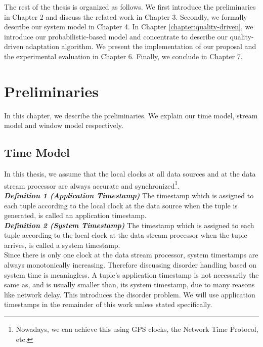 \documentclass[a4paper, 11pt, twoside]{report}
\begin{document}
The rest of the thesis is organized as follows. We first introduce the preliminaries in Chapter 2 and discuss the related work in Chapter 3. Secondly, we formally describe our system model in Chapter 4. In Chapter \ref{chapter:quality-driven}, we introduce our probabilistic-based model and concentrate to describe our quality-driven adaptation algorithm. We present the implementation of our proposal and the experimental evaluation in Chapter 6. Finally, we conclude in Chapter 7.\\

\cleardoublepage


\chapter{Preliminaries}
In this chapter, we describe the preliminaries. We explain our time model, stream model and window model respectively.\\

\section{Time Model}
In this thesis, we assume that the local clocks at all data sources and at the data stream processor are always accurate and synchronized\footnote{Nowadays, we can achieve this using GPS clocks, the Network Time Protocol, etc.}.\\

\textbf{\textit{Definition 1 (Application Timestamp)}} The timestamp which is assigned to each tuple according to the local clock at the data source when the tuple is generated, is called an application timestamp.\\

\textbf{\textit{Definition 2 (System Timestamp)}} The timestamp which is assigned to each tuple according to the local clock at the data stream processor when the tuple arrives, is called a system timestamp.\\

Since there is only one clock at the data stream processor, system timestamps are always monotonically increasing. Therefore discussing disorder handling based on system time is meaningless. A tuple's application timestamp is not necessarily the same as, and is usually smaller than, its system timestamp, due to many reasons like network delay. This introduces the disorder problem. We will use application timestamps in the remainder of this work unless stated specifically.\\
\end{document}
